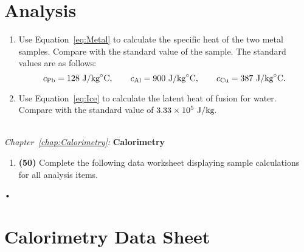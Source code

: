 \documentclass[main.tex]{subfiles}
\begin{document}
\section*{Analysis}
\begin{enumerate}
\item
Use Equation~\eqref{eq:Metal} to calculate the specific heat of the two metal samples. Compare with the standard value of the sample. The standard values are as follows:
\[
c_{\text{Pb}}=128 \text{ J}/\text{kg}\celsius, \qquad c_{\text{Al}}=900 \text{ J}/\text{kg}\celsius, \qquad c_{\text{Cu}}=387 \text{ J}/\text{kg}\celsius.
\]
\item
Use Equation~\eqref{eq:Ice} to calculate the latent heat of fusion for water. Compare with the standard value of $3.33\times 10^{5} \text{ J}/\text{kg}.$
\end{enumerate}

\begin{samepage}
\hrulefill \\
\emph{Chapter~\ref{chap:Calorimetry}:} \textbf{Calorimetry}
\begin{enumerate}
\item
\textbf{(50)} Complete the following data worksheet displaying sample calculations for all analysis items. 
\end{enumerate}•
\end{samepage}

\newpage
\enlargethispage{3cm}
\section{Calorimetry Data Sheet}
\end{document}
